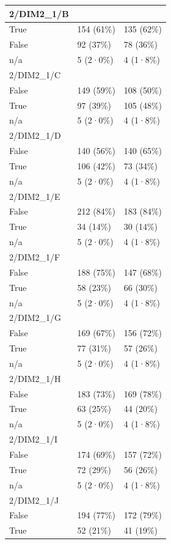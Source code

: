 \documentclass[
]{book}
\begin{document}
\begin{tabular}{l|l|l}
\hline
2/DIM2\_1/B &  & \\
\hline
True & 154 (61\%) & 135 (62\%)\\
\hline
False & 92 (37\%) & 78 (36\%)\\
\hline
n/a & 5 (2·0\%) & 4 (1·8\%)\\
\hline
2/DIM2\_1/C &  & \\
\hline
False & 149 (59\%) & 108 (50\%)\\
\hline
True & 97 (39\%) & 105 (48\%)\\
\hline
n/a & 5 (2·0\%) & 4 (1·8\%)\\
\hline
2/DIM2\_1/D &  & \\
\hline
False & 140 (56\%) & 140 (65\%)\\
\hline
True & 106 (42\%) & 73 (34\%)\\
\hline
n/a & 5 (2·0\%) & 4 (1·8\%)\\
\hline
2/DIM2\_1/E &  & \\
\hline
False & 212 (84\%) & 183 (84\%)\\
\hline
True & 34 (14\%) & 30 (14\%)\\
\hline
n/a & 5 (2·0\%) & 4 (1·8\%)\\
\hline
2/DIM2\_1/F &  & \\
\hline
False & 188 (75\%) & 147 (68\%)\\
\hline
True & 58 (23\%) & 66 (30\%)\\
\hline
n/a & 5 (2·0\%) & 4 (1·8\%)\\
\hline
2/DIM2\_1/G &  & \\
\hline
False & 169 (67\%) & 156 (72\%)\\
\hline
True & 77 (31\%) & 57 (26\%)\\
\hline
n/a & 5 (2·0\%) & 4 (1·8\%)\\
\hline
2/DIM2\_1/H &  & \\
\hline
False & 183 (73\%) & 169 (78\%)\\
\hline
True & 63 (25\%) & 44 (20\%)\\
\hline
n/a & 5 (2·0\%) & 4 (1·8\%)\\
\hline
2/DIM2\_1/I &  & \\
\hline
False & 174 (69\%) & 157 (72\%)\\
\hline
True & 72 (29\%) & 56 (26\%)\\
\hline
n/a & 5 (2·0\%) & 4 (1·8\%)\\
\hline
2/DIM2\_1/J &  & \\
\hline
False & 194 (77\%) & 172 (79\%)\\
\hline
True & 52 (21\%) & 41 (19\%)\\

\end{tabular}
\end{document}
